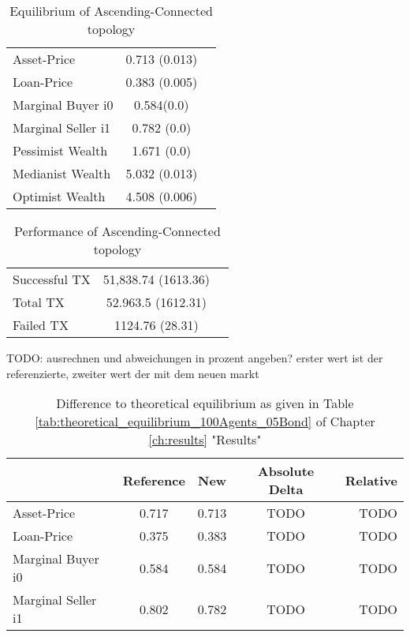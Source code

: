 \documentclass[Bachelorarbeit.tex]{subfiles}
\begin{document}
\begin{table}[h]
	\caption{Equilibrium of Ascending-Connected topology}
	\centering
	\begin{tabular} { l c r }
		\hline
		Asset-Price & 0.713 (0.013) \\
		Loan-Price & 0.383 (0.005) \\
		Marginal Buyer i0 & 0.584(0.0) \\
		Marginal Seller i1 & 0.782 (0.0) \\
		\hline
		Pessimist Wealth & 1.671 (0.0) \\
		Medianist Wealth & 5.032 (0.013) \\
		Optimist Wealth & 4.508 (0.006) \\
		\hline
	\end{tabular}
\end{table} 

\begin{table}[h]
	\caption{Performance of Ascending-Connected topology}
	\centering
	\begin{tabular} { l c r }
		\hline
		Successful TX & 51,838.74 (1613.36) \\
		Total TX & 52.963.5 (1612.31) \\
		Failed TX & 1124.76 (28.31) \\
		\hline
	\end{tabular}
\end{table}

TODO: ausrechnen und abweichungen in prozent angeben? 
erster wert ist der referenzierte, zweiter wert der mit dem neuen markt

\begin{table}[h]
	\caption{Difference to theoretical equilibrium as given in Table \ref{tab:theoretical_equilibrium_100Agents_05Bond} of Chapter \ref{ch:results} "Results"}
	\centering
	\begin{tabular} { l c c c r }
		& Reference & New & Absolute Delta & Relative \\
		\hline
		Asset-Price & 0.717 & 0.713 & TODO & TODO \\
		Loan-Price & 0.375 & 0.383 & TODO & TODO \\
		Marginal Buyer i0 & 0.584 & 0.584 & TODO & TODO \\
		Marginal Seller i1 & 0.802 & 0.782 & TODO & TODO \\
		\hline
	\end{tabular}
\end{table} 
\end{document}
